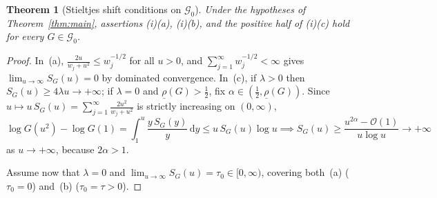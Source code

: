 \documentclass[11pt,a4paper,reqno]{amsart}
\newtheorem{theorem}{Theorem}[section]
\theoremstyle{definition}
\theoremstyle{remark}
\numberwithin{equation}{section}
\newcommand{\dd}{\mathrm{d}}
\begin{document}
\begin{theorem}[Stieltjes shift conditions on $\mathcal{G}_0$]
\label{thm:three-regimes}
Under the hypotheses of Theorem~\ref{thm:main}, assertions \textup{(i)(a)}, \textup{(i)(b)}, and the positive half of \textup{(i)(c)} hold for every $G \in \mathcal{G}_0$.
\end{theorem}

\begin{proof}
In~(a), $\frac{2u}{w_j + u^2} \le w_j^{-1/2}$ for all $u > 0$, and $\sum_{j=1}^{\infty} w_j^{-1/2} < \infty$ gives $\lim_{u\to\infty} S_G(u) = 0$ by dominated convergence. In~(c), if $\lambda > 0$ then $S_G(u) \ge 4\lambda u \to +\infty$; if $\lambda = 0$ and $\underline{\rho}(G) > \frac{1}{2}$, fix $\alpha \in (\frac{1}{2}, \underline{\rho}(G))$. Since $u \mapsto u\,S_G(u) = \sum_{j=1}^{\infty}\frac{2u^2}{w_j + u^2}$ is strictly increasing on $(0,\infty)$,
\begin{equation}
  \log G(u^2) - \log G(1)
  = \int_{1}^{u} \frac{y\,S_G(y)}{y}\,\dd y
  \le u\,S_G(u)\log u
  \implies
  S_G(u) \ge \frac{u^{2\alpha} - \mathcal{O}(1)}{u\log u} \longrightarrow +\infty
  \label{eq:stieltjes-lower-order}
\end{equation}
as $u \to +\infty$, because $2\alpha > 1$.

Assume now that $\lambda = 0$ and $\lim_{u\to\infty} S_G(u) = \tau_0 \in [0,\infty)$, covering both~(a) ($\tau_0 = 0$) and~(b) ($\tau_0 = \tau > 0$).


\end{proof}
\end{document}
